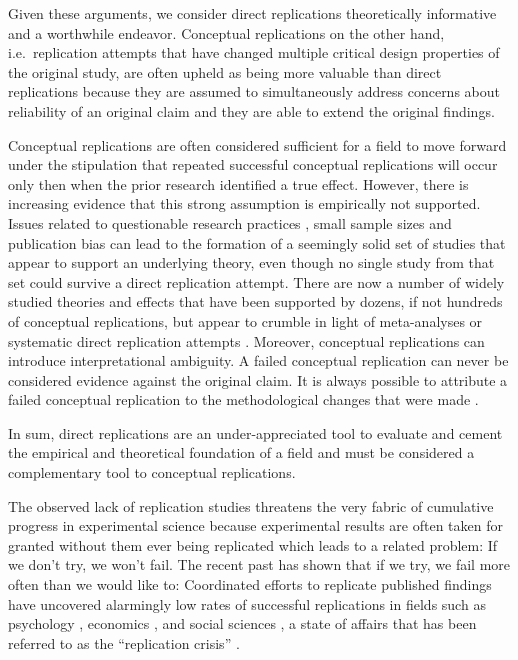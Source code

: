 \documentclass[cm,linguex]{glossa}
\begin{document}
Given these arguments, we consider direct replications theoretically informative and a worthwhile endeavor.
Conceptual replications on the other hand, i.e.~replication attempts that have changed multiple critical design properties of the original study, are often upheld as being more valuable than direct replications because they are assumed to simultaneously address concerns about reliability of an original claim and they are able to extend the original findings.

Conceptual replications are often considered sufficient for a field to move forward under the stipulation that repeated successful conceptual replications will occur only then when the prior research identified a true effect.
However, there is increasing evidence that this strong assumption is empirically not supported.
Issues related to questionable research practices \citep{john2012measuring}, small sample sizes \citep{button2013power} and publication bias \citep{fanelli2012negative} can lead to the formation of a seemingly solid set of studies that appear to support an underlying theory, even though no single study from that set could survive a direct replication attempt.
There are now a number of widely studied theories and effects that have been supported by dozens, if not hundreds of conceptual replications, but appear to crumble in light of meta-analyses or systematic direct replication attempts \citep[e.g.,][]{shanks2015romance, wagenmakers2016registered}.
Moreover, conceptual replications can introduce interpretational ambiguity.
A failed conceptual replication can never be considered evidence against the original claim.
It is always possible to attribute a failed conceptual replication to the methodological changes that were made \citep[e.g.,][]{pashler2012replicability}.

In sum, direct replications are an under-appreciated tool to evaluate and cement the empirical and theoretical foundation of a field and must be considered a complementary tool to conceptual replications.

The observed lack of replication studies threatens the very fabric of cumulative progress in experimental science because experimental results are often taken for granted without them ever being replicated which leads to a related problem: If we don't try, we won't fail. The recent past has shown that if we try, we fail more often than we would like to: Coordinated efforts to replicate published findings have uncovered alarmingly low rates of successful replications in fields such as psychology \citep{open_science_collaboration_estimating_2015}, economics \citep{camerer_evaluating_2016}, and social sciences \citep{camerer_evaluating_2018}, a state of affairs that has been referred to as the ``replication crisis'' \citep{fidler_reproducibility_2018}.
\end{document}

